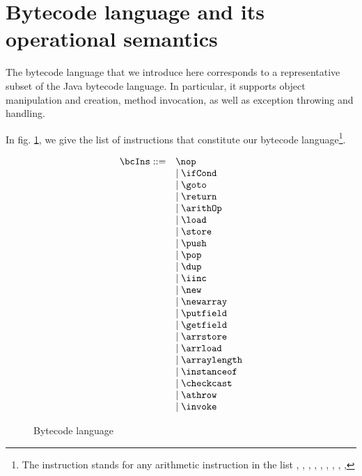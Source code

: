 
\newtheorem{StateTransition}{Definition}[section]
\newtheorem{transClosStateTrans0}[StateTransition]{Definition}
\newtheorem{transClosStateTrans1}[StateTransition]{Definition}



\section{Bytecode language and its operational semantics} \label{opSem}
 The bytecode language that we introduce here corresponds to a representative subset of the Java bytecode language. 
 In particular, it supports object manipulation and creation, method invocation, as well as exception throwing and handling.
 
In fig. \ref{opSem:bclang}, we give the list of instructions that constitute our bytecode
 language\footnote{The instruction \arithOp{} stands for any arithmetic instruction in the list  , , , 
 , ,  , , , ,  }.
 
\begin{figure}[h] 
\begin{frameit}
      $$  \begin{array}{ll}
             \bcIns ::= & \nop \\
	                & \mid \ifCond \\
	                & \mid \goto  \\ 
			& \mid \return  \\ 
			& \mid \arithOp  \\ 
			& \mid \load \\ 
			& \mid \store \\
			& \mid \push \\
			& \mid \pop \\
			& \mid \dup \\
			& \mid \iinc \\
			& \mid \new \\
			& \mid \newarray   \\ 	
			& \mid \putfield  \\
			& \mid \getfield  \\
			& \mid \arrstore   \\
			& \mid \arrload  \\
			& \mid \arraylength  \\
			& \mid \instanceof  \\
			& \mid \checkcast \\
			& \mid \athrow  \\
			& \mid \invoke  \\
	\end{array}$$
        \caption{\sc Bytecode language}
        \label{opSem:bclang}
\end{frameit}
\end{figure}  
 	 

